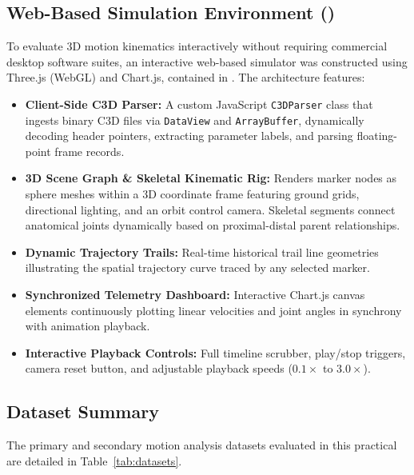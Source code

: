 \documentclass[12pt,a4paper]{article}
\newcommand{\csvfile}[1]{\texttt{\detokenize{#1}}}
\begin{document}
\subsection{Web-Based Simulation Environment (\csvfile{simulator.html})}
To evaluate 3D motion kinematics interactively without requiring commercial desktop software suites, an interactive web-based simulator was constructed using Three.js (WebGL) and Chart.js, contained in \csvfile{simulator.html}. The architecture features:
\begin{itemize}
    \item \textbf{Client-Side C3D Parser:} A custom JavaScript \texttt{C3DParser} class that ingests binary C3D files via \texttt{DataView} and \texttt{ArrayBuffer}, dynamically decoding header pointers, extracting parameter labels, and parsing floating-point frame records.
    \item \textbf{3D Scene Graph \& Skeletal Kinematic Rig:} Renders marker nodes as sphere meshes within a 3D coordinate frame featuring ground grids, directional lighting, and an orbit control camera. Skeletal segments connect anatomical joints dynamically based on proximal-distal parent relationships.
    \item \textbf{Dynamic Trajectory Trails:} Real-time historical trail line geometries illustrating the spatial trajectory curve traced by any selected marker.
    \item \textbf{Synchronized Telemetry Dashboard:} Interactive Chart.js canvas elements continuously plotting linear velocities and joint angles in synchrony with animation playback.
    \item \textbf{Interactive Playback Controls:} Full timeline scrubber, play/stop triggers, camera reset button, and adjustable playback speeds ($0.1\times$ to $3.0\times$).
\end{itemize}

\subsection{Dataset Summary}
The primary and secondary motion analysis datasets evaluated in this practical are detailed in Table~\ref{tab:datasets}.
\end{document}
